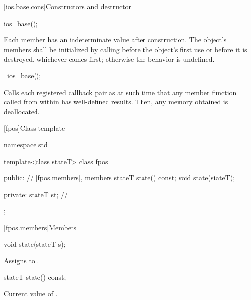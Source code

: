 [ios.base.cons]{Constructors and destructor}

%
\begin{itemdecl}
ios_base();
\end{itemdecl}

\begin{itemdescr}
\pnum
\effects
Each
member has an indeterminate value after construction.
The object's members shall be initialized by calling
before the object's first use or before it is destroyed, whichever comes first; otherwise
the behavior is undefined.
\end{itemdescr}

%
\begin{itemdecl}
~ios_base();
\end{itemdecl}

\begin{itemdescr}
\pnum
\effects
Calls each registered callback pair
 as
at such time that any
member function called from within
has well-defined results.
Then, any memory obtained is deallocated.
\end{itemdescr}

[fpos]{Class template }

%
\begin{codeblock}
namespace std {
  template<class stateT> class fpos {
  public:
    // \ref{fpos.members}, members
    stateT state() const;
    void state(stateT);

  private:
    stateT st;                  // \expos
  };
}
\end{codeblock}

[fpos.members]{Members}

%
\begin{itemdecl}
void state(stateT s);
\end{itemdecl}

\begin{itemdescr}
\pnum
\effects
Assigns  to .
\end{itemdescr}

%
\begin{itemdecl}
stateT state() const;
\end{itemdecl}

\begin{itemdescr}
\pnum
\returns
Current value of .
\end{itemdescr}

